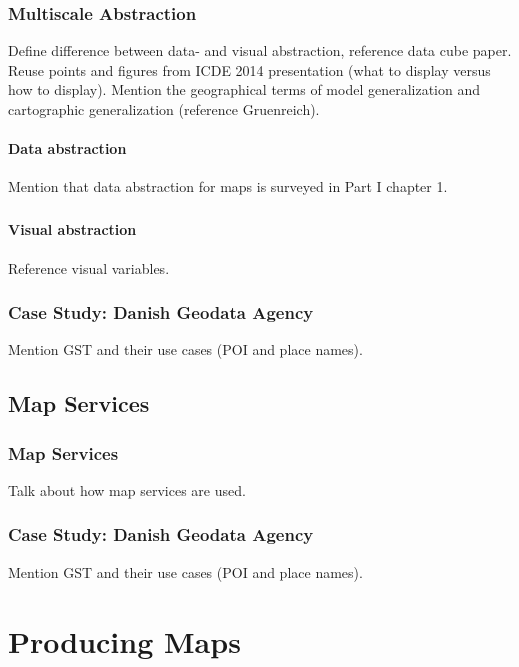 \documentclass[11pt, oneside]{report}   	%
\begin{document}
\section{Multiscale Abstraction}
Define difference between data- and visual abstraction, reference data cube paper. Reuse points and figures from ICDE 2014 presentation (what to display versus how to display). Mention the geographical terms of model generalization and cartographic generalization (reference Gruenreich). 

\subsection{Data abstraction}
Mention that data abstraction for maps is surveyed in Part I chapter 1.

\subsubsection{}

\subsection{Visual abstraction}
Reference visual variables.

\section{Case Study: Danish Geodata Agency}
Mention GST and their use cases (POI and place names).

\chapter{Map Services}

\section{Map Services}
Talk about how map services are used.

\section{Case Study: Danish Geodata Agency}
Mention GST and their use cases (POI and place names).


\part{Producing Maps}
\end{document}
